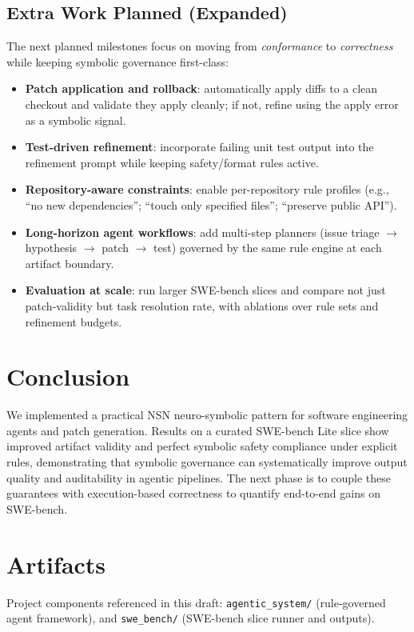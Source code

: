 \documentclass[conference]{IEEEtran}
\begin{document}
\subsection{Extra Work Planned (Expanded)}
The next planned milestones focus on moving from \emph{conformance} to \emph{correctness} while keeping symbolic governance first-class:
\begin{itemize}
  \item \textbf{Patch application and rollback}: automatically apply diffs to a clean checkout and validate they apply cleanly; if not, refine using the apply error as a symbolic signal.
  \item \textbf{Test-driven refinement}: incorporate failing unit test output into the refinement prompt while keeping safety/format rules active.
  \item \textbf{Repository-aware constraints}: enable per-repository rule profiles (e.g., ``no new dependencies''; ``touch only specified files''; ``preserve public API'').
  \item \textbf{Long-horizon agent workflows}: add multi-step planners (issue triage $\rightarrow$ hypothesis $\rightarrow$ patch $\rightarrow$ test) governed by the same rule engine at each artifact boundary.
  \item \textbf{Evaluation at scale}: run larger SWE-bench slices and compare not just patch-validity but task resolution rate, with ablations over rule sets and refinement budgets.
\end{itemize}

\section{Conclusion}
We implemented a practical NSN neuro-symbolic pattern for software engineering agents and patch generation. Results on a curated SWE-bench Lite slice show improved artifact validity and perfect symbolic safety compliance under explicit rules, demonstrating that symbolic governance can systematically improve output quality and auditability in agentic pipelines. The next phase is to couple these guarantees with execution-based correctness to quantify end-to-end gains on SWE-bench.

\section*{Artifacts}
Project components referenced in this draft:
\texttt{agentic\_system/} (rule-governed agent framework), and \texttt{swe\_bench/} (SWE-bench slice runner and outputs).



\end{document}
